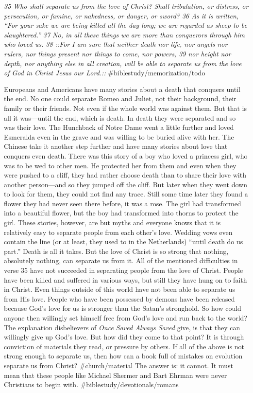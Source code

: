\emph{35 Who shall separate us from the love of Christ? Shall
tribulation, or distress, or persecution, or famine, or nakedness, or
danger, or sword? 36 As it is written,} \emph{``For your sake we are
being killed all the day long;\emph{ }we are regarded as sheep to be
slaughtered.''} \emph{37 No, in all these things we are more than
conquerors through him who loved us. 38 ::For I am sure that neither
death nor life, nor angels nor rulers, nor things present nor things to
come, nor powers, 39 nor height nor depth, nor anything else in all
creation, will be able to separate us from the love of God in Christ
Jesus our Lord.::} \#biblestudy/memorization/todo

Europeans and Americans have many stories about a death that conquers
until the end. No one could separate Romeo and Juliet, not their
background, their family or their friends. Not even if the whole world
was against them. But that is all it was---until the end, which is
death. In death they were separated and so was their love. The Hunchback
of Notre Dame went a little further and loved Esmeralda even in the
grave and was willing to be buried alive with her. The Chinese take it
another step further and have many stories about love that conquers even
death. There was this story of a boy who loved a princess girl, who was
to be wed to other men. He protected her from them and even when they
were pushed to a cliff, they had rather choose death than to share their
love with another person---and so they jumped off the cliff. But later
when they went down to look for them, they could not find any trace.
Still some time later they found a flower they had never seen there
before, it was a rose. The girl had transformed into a beautiful flower,
but the boy had transformed into thorns to protect the girl. These
stories, however, are but myths and everyone knows that it is relatively
easy to separate people from each other's love. Wedding vows even
contain the line (or at least, they used to in the Netherlands) ``until
death do us part.'' Death is all it takes. But the love of Christ is so
strong that nothing, absolutely nothing, can separate us from it. All of
the mentioned difficulties in verse 35 have not succeeded in separating
people from the love of Christ. People have been killed and suffered in
various ways, but still they have hung on to faith in Christ. Even
things outside of this world have not been able to separate us from His
love. People who have been possessed by demons have been released
because God's love for us is stronger than the Satan's stronghold. So
how could anyone then willingly set himself free from God's love and run
back to the world? The explanation disbelievers of \emph{Once Saved
Always Saved} give, is that they can willingly give up God's love. But
how did they come to that point? It is through conviction of materials
they read, or pressure by others. If all of the above is not strong
enough to separate us, then how can a book full of mistakes on evolution
separate us from Christ? \#church/material The answer is: it cannot. It
must mean that these people like Michael Shermer and Bart Ehrman were
never Christians to begin with. \#biblestudy/devotionals/romans


